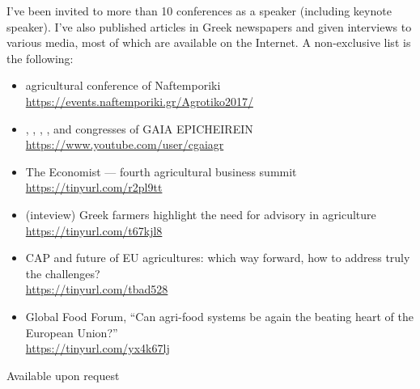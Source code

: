 \documentclass[10pt,a4paper]{article} %
\begin{document}
I've been invited to more than 10 conferences as a speaker (including keynote speaker). I've also published
articles in Greek newspapers and given interviews to various media, most of which are available on the Internet.
A non-exclusive list is the following:
\begin{itemize}
\item {} agricultural conference of Naftemporiki \href{https://events.naftemporiki.gr/Agrotiko2017/}{https://events.naftemporiki.gr/Agrotiko2017/}
\item {}, , , ,  and  congresses of GAIA EPICHEIREIN \href{https://www.youtube.com/user/cgaiagr}{https://www.youtube.com/user/cgaiagr}
\item The Economist --- fourth agricultural business summit \href{http://www.hazliseconomist.com/gr/event/Fourth_Agricultural_Business_Summit}{https://tinyurl.com/r2pl9tt}
\item (inteview) Greek farmers highlight the need for advisory in agriculture
  \href{https://www.euractiv.com/section/agriculture-food/news/greek-farmers-highlight-the-need-for-advisory-in-agriculture/}{https://tinyurl.com/t67kjl8}
\item CAP and future of EU agricultures: which way forward, how to address truly the challenges?\\
  \href{https://www.farm-europe.eu/evenement/page/2/}{https://tinyurl.com/tbad528}
\item Global Food Forum, ``Can agri-food systems be again the beating heart of the European Union?''\\
  \href{https://www.farm-europe.eu/evenement/global-food-forum-2018-2/}{https://tinyurl.com/yx4k67lj}
\end{itemize}



\spacedhrule{1.6em}{-0.4em} %


Available upon request
\end{document}

